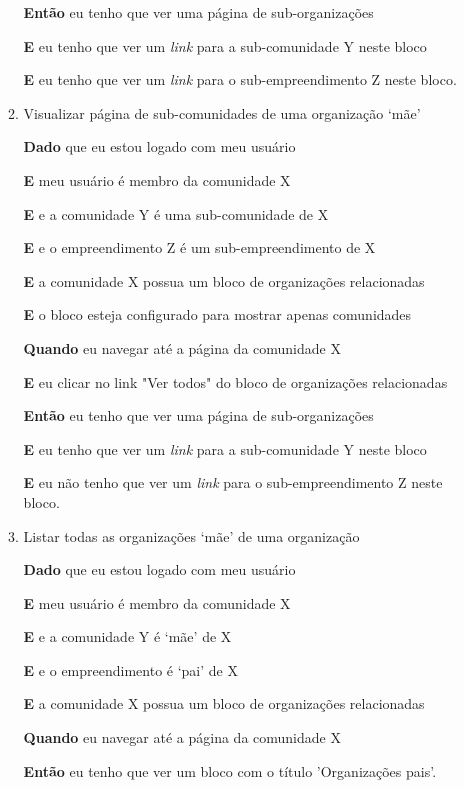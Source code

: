 \begin{enumerate}
\begin{enumerate}
\textbf{Então} eu tenho que ver uma página de sub-organizações

\textbf{E} eu tenho que ver um \textit{link} para a sub-comunidade Y neste
bloco

\textbf{E} eu tenho que ver um \textit{link} para o sub-empreendimento Z
neste bloco.

\item Visualizar página de sub-comunidades de uma organização `mãe'

\textbf{Dado} que eu estou logado com meu usuário

\textbf{E} meu usuário é membro da comunidade X

\textbf{E} e a comunidade Y é uma sub-comunidade de X

\textbf{E} e o empreendimento Z é um sub-empreendimento de X

\textbf{E} a comunidade X possua um bloco de organizações relacionadas

\textbf{E} o bloco esteja configurado para mostrar apenas comunidades

\textbf{Quando} eu navegar até a página da comunidade X

\textbf{E} eu clicar no link "Ver todos" do bloco de organizações relacionadas

\textbf{Então} eu tenho que ver uma página de sub-organizações

\textbf{E} eu tenho que ver um \textit{link} para a sub-comunidade Y neste
bloco

\textbf{E} eu não tenho que ver um \textit{link} para o sub-empreendimento Z
neste bloco.

\item Listar todas as organizações `mãe' de uma organização

\textbf{Dado} que eu estou logado com meu usuário

\textbf{E} meu usuário é membro da comunidade X

\textbf{E} e a comunidade Y é `mãe' de X

\textbf{E} e o empreendimento é `pai' de X

\textbf{E} a comunidade X possua um bloco de organizações relacionadas

\textbf{Quando} eu navegar até a página da comunidade X

\textbf{Então} eu tenho que ver um bloco com o título 'Organizações pais'.


\end{enumerate}
\end{enumerate}
